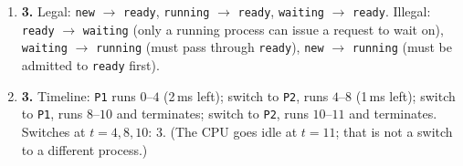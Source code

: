 \documentclass[11pt]{article}
\begin{document}
\begin{enumerate}
\item[\textbf{Q9}] \textbf{3.} Legal: \texttt{new} $\to$ \texttt{ready}, \texttt{running} $\to$ \texttt{ready}, \texttt{waiting} $\to$ \texttt{ready}. Illegal: \texttt{ready} $\to$ \texttt{waiting} (only a running process can issue a request to wait on), \texttt{waiting} $\to$ \texttt{running} (must pass through \texttt{ready}), \texttt{new} $\to$ \texttt{running} (must be admitted to \texttt{ready} first).

\item[\textbf{Q10}] \textbf{3.} Timeline: \texttt{P1} runs $0$--$4$ (2\,ms left); switch to \texttt{P2}, runs $4$--$8$ (1\,ms left); switch to \texttt{P1}, runs $8$--$10$ and terminates; switch to \texttt{P2}, runs $10$--$11$ and terminates. Switches at $t = 4, 8, 10$: $3$. (The CPU goes idle at $t = 11$; that is not a switch to a different process.)

\end{enumerate}
\end{document}
